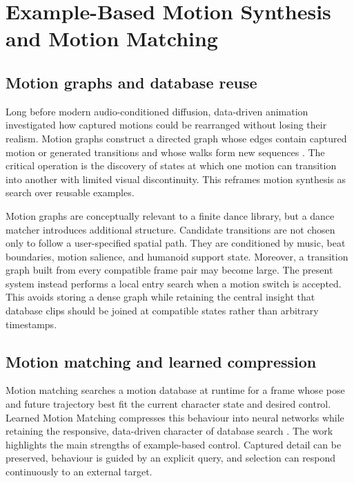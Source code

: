\section{Example-Based Motion Synthesis and Motion Matching}
\label{sec:lit_motion_matching}

\subsection{Motion graphs and database reuse}
\label{subsec:lit_motion_graphs}

Long before modern audio-conditioned diffusion, data-driven animation
investigated how captured motions could be rearranged without losing their
realism. Motion graphs construct a directed graph whose edges contain captured
motion or generated transitions and whose walks form new sequences
\cite{kovar2023motion}. The critical operation is the discovery of states
at which one motion can transition into another with limited visual
discontinuity. This reframes motion synthesis as search over reusable examples.

Motion graphs are conceptually relevant to a finite dance library, but a dance
matcher introduces additional structure. Candidate transitions are not chosen
only to follow a user-specified spatial path. They are conditioned by music,
beat boundaries, motion salience, and humanoid support state. Moreover, a
transition graph built from every compatible frame pair may become large. The
present system instead performs a local entry search when a motion switch is
accepted. This avoids storing a dense graph while retaining the central insight
that database clips should be joined at compatible states rather than arbitrary
timestamps.

\subsection{Motion matching and learned compression}
\label{subsec:lit_learned_motion_matching}

Motion matching searches a motion database at runtime for a frame whose pose
and future trajectory best fit the current character state and desired control.
Learned Motion Matching compresses this behaviour into neural networks while
retaining the responsive, data-driven character of database search
\cite{holden2020learned}. The work highlights the main strengths of example-based
control. Captured detail can be preserved, behaviour is guided by an explicit
query, and selection can respond continuously to an external target.

